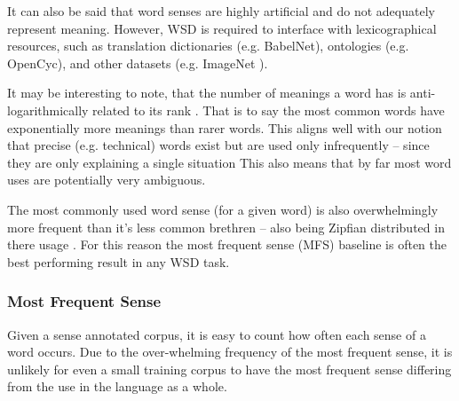 \documentclass[12pt,parskip]{komatufte}
\begin{document}
It can also be said that word senses are highly artificial and do not adequately represent meaning.
However, WSD is required to interface with  lexicographical resources,
such as translation dictionaries (e.g. BabelNet), ontologies (e.g. OpenCyc), and other datasets (e.g. ImageNet ).


It may be interesting to note, that the number of meanings a word has is anti-logarithmically related to its rank .
That is to say the most common words have exponentially more meanings than rarer words.
This aligns well with our notion that precise (e.g. technical) words exist but are used only infrequently -- since they are only explaining a single situation
This also means that by far most word uses are potentially very ambiguous.

The most commonly used word sense (for a given word) is also overwhelmingly more frequent than it's less common brethren -- also being Zipfian distributed in there usage .
For this reason the most frequent sense (MFS) baseline is often the best performing result in any WSD task.
\subsubsection{Most Frequent Sense}\label{sec:most-frequent-sense}
Given a sense annotated corpus, it is easy to count how often each sense of a word occurs.
Due to the over-whelming frequency of the most frequent sense, it is unlikely for even a small training corpus to have the most frequent sense differing from the use in the language as a whole.
\end{document}
